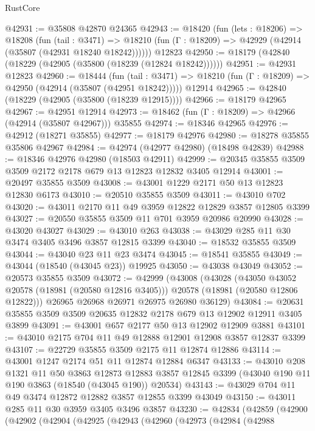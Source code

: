 \begin{lexlean}{RustCore}
\begin{coremodule}
@42931 := @35808 @42870 @24365
@42943 := @18420
    (fun (lets : @18206) =>
    @18208
      (fun (tail : @3471) =>
      @18210 (fun (Γ : @18209) => @42929 (@42914 (@35807 (@42931 @18240 @18242))))))
    @12823
@42950 := @18179 (@42840 (@18229 (@42905 (@35800 (@18239 (@12824 @18242))))))
@42951 := @42931 @12823
@42960 := @18444
    (fun (tail : @3471) => @18210 (fun (Γ : @18209) => @42950 (@42914 (@35807 (@42951 @18242)))))
    @12914
@42965 := @42840 (@18229 (@42905 (@35800 (@18239 @12915))))
@42966 := @18179 @42965
@42967 := @42951 @12914
@42973 := @18462 (fun (Γ : @18209) => @42966 (@42914 (@35807 @42967))) @35855
@42974 := @18346 @42965
@42976 := @42912 (@18271 @35855)
@42977 := @18179 @42976
@42980 := @18278 @35855 @35806 @42967
@42984 := @42974 (@42977 @42980) (@18498 @42839)
@42988 := @18346 @42976 @42980 (@18503 @42911)
@42999 := @20345 @35855 @3509 @3509 @2172 @2178 @679 @13 @12823 @12832 @3405 @12914
@43001 := @20497 @35855 @3509
@43008 := @43001 @1229 @2171 @50 @13 @12823 @12830 @6173
@43010 := @20510 @35855 @3509
@43011 := @43010 @702
@43020 := @43011 @2170 @11 @49 @3959 @12822 @12829 @3857 @12805 @3399
@43027 := @20550 @35855 @3509 @11 @701 @3959 @20986 @20990
@43028 := @43020 @43027
@43029 := @43010 @263
@43038 := @43029 @285 @11 @30 @3474 @3405 @3496 @3857 @12815 @3399
@43040 := @18532 @35855 @3509
@43044 := @43040 @23 @11 @23 @3474
@43045 := @18541 @35855
@43049 := @43044 (@18540 (@43045 @23)) @19925
@43050 := @43038 @43049
@43052 := @20573 @35855 @3509
@43072 := @42999
    (@43008
      (@43028
        (@43050 @43052 @20578 (@18981 (@20580 @12816 @3405)))
        @20578
        (@18981 (@20580 @12806 @12822)))
      @26965
      @26968
      @26971
      @26975
      @26980
      @36129)
@43084 := @20631 @35855 @3509 @3509 @20635 @12832 @2178 @679 @13 @12902 @12911 @3405 @3899
@43091 := @43001 @657 @2177 @50 @13 @12902 @12909 @3881
@43101 := @43010 @2175 @704 @11 @49 @12888 @12901 @12908 @3857 @12837 @3399
@43107 := @22729 @35855 @3509 @2175 @11 @12874 @12886
@43114 := @43001 @1247 @2174 @51 @11 @12874 @12884 @6347
@43133 := @43010
    @208
    @1321
    @11
    @50
    @3863
    @12873
    @12883
    @3857
    @12845
    @3399
    (@43040 @190 @11 @190 @3863 (@18540 (@43045 @190)) @20534)
@43143 := @43029 @704 @11 @49 @3474 @12872 @12882 @3857 @12855 @3399 @43049
@43150 := @43011 @285 @11 @30 @3959 @3405 @3496 @3857
@43230 := @42834
    (@42859
      (@42900
        (@42902
          (@42904
            (@42925
              (@42943
                (@42960
                  (@42973
                    (@42984
                      (@42988

\end{coremodule}
\end{lexlean}
